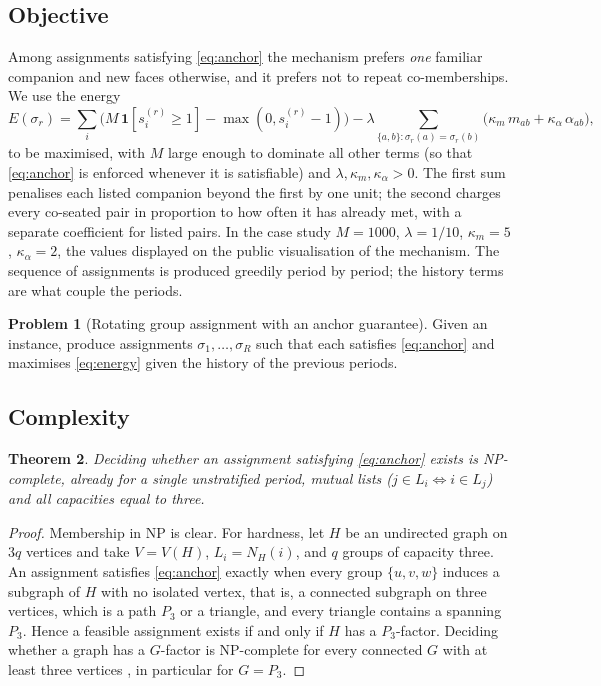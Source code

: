 \documentclass[11pt,a4paper]{article}
\theoremstyle{plain}
\newtheorem{theorem}{Theorem}[section]
\theoremstyle{definition}
\newtheorem{problem}[theorem]{Problem}
\theoremstyle{remark}
\newcommand{\ind}[1]{\mathbf{1}[#1]}
\begin{document}
\subsection{Objective}
Among assignments satisfying \eqref{eq:anchor} the mechanism prefers \emph{one} familiar companion and new faces otherwise, and it prefers not to repeat co-memberships. We use the energy
\begin{equation}
E(\sigma_r) = \sum_{i} \Big( M\, \ind{s^{(r)}_i \ge 1} - \max(0, s^{(r)}_i - 1) \Big) - \lambda \sum_{\{a,b\} : \sigma_r(a) = \sigma_r(b)} \big( \kappa_m\, m_{ab} + \kappa_\alpha\, \alpha_{ab} \big), \label{eq:energy}
\end{equation}
to be maximised, with $M$ large enough to dominate all other terms (so that \eqref{eq:anchor} is enforced whenever it is satisfiable) and $\lambda, \kappa_m, \kappa_\alpha > 0$. The first sum penalises each listed companion beyond the first by one unit; the second charges every co-seated pair in proportion to how often it has already met, with a separate coefficient for listed pairs. In the case study $M = 1000$, $\lambda = 1/10$, $\kappa_m = 5$, $\kappa_\alpha = 2$, the values displayed on the public visualisation of the mechanism. The sequence of assignments is produced greedily period by period; the history terms are what couple the periods.

\begin{problem}[Rotating group assignment with an anchor guarantee]
Given an instance, produce assignments $\sigma_1, \dots, \sigma_R$ such that each satisfies \eqref{eq:anchor} and maximises \eqref{eq:energy} given the history of the previous periods.
\end{problem}

\subsection{Complexity}
\begin{theorem}\label{thm:np}
Deciding whether an assignment satisfying \eqref{eq:anchor} exists is NP-complete, already for a single unstratified period, mutual lists ($j \in L_i \Leftrightarrow i \in L_j$) and all capacities equal to three.
\end{theorem}
\begin{proof}
Membership in NP is clear. For hardness, let $H$ be an undirected graph on $3q$ vertices and take $V = V(H)$, $L_i = N_H(i)$, and $q$ groups of capacity three. An assignment satisfies \eqref{eq:anchor} exactly when every group $\{u,v,w\}$ induces a subgraph of $H$ with no isolated vertex, that is, a connected subgraph on three vertices, which is a path $P_3$ or a triangle, and every triangle contains a spanning $P_3$. Hence a feasible assignment exists if and only if $H$ has a $P_3$-factor. Deciding whether a graph has a $G$-factor is NP-complete for every connected $G$ with at least three vertices \citep{kirkpatrick1983factor}, in particular for $G = P_3$.
\end{proof}
\end{document}
